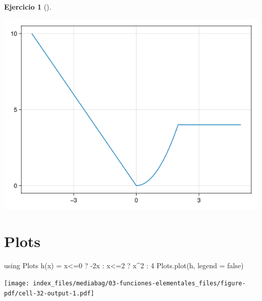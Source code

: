 \documentclass[
  a4paper,
]{scrreport}
\newenvironment{Shaded}{\begin{snugshade}}{\end{snugshade}}
\newcommand{\BuiltInTok}[1]{\textcolor[rgb]{0.00,0.23,0.31}{#1}}
\newcommand{\ConstantTok}[1]{\textcolor[rgb]{0.56,0.35,0.01}{#1}}
\newcommand{\FloatTok}[1]{\textcolor[rgb]{0.68,0.00,0.00}{#1}}
\newcommand{\FunctionTok}[1]{\textcolor[rgb]{0.28,0.35,0.67}{#1}}
\newcommand{\ImportTok}[1]{\textcolor[rgb]{0.00,0.46,0.62}{#1}}
\newcommand{\NormalTok}[1]{\textcolor[rgb]{0.00,0.23,0.31}{#1}}
\newcommand{\OperatorTok}[1]{\textcolor[rgb]{0.37,0.37,0.37}{#1}}
\theoremstyle{definition}
\newtheorem{exercise}{Ejercicio}[chapter]
\theoremstyle{remark}
\begin{document}
\begin{exercise}[]
\begin{tcolorbox}
\includegraphics{03-funciones-elementales_files/figure-pdf/cell-31-output-1.png}

\section{Plots}

\begin{Shaded}
\begin{Highlighting}[]
\ImportTok{using} \BuiltInTok{Plots}
\FunctionTok{h}\NormalTok{(x) }\OperatorTok{=}\NormalTok{ x}\OperatorTok{\textless{}=}\FloatTok{0}\NormalTok{ ? }\OperatorTok{{-}}\FloatTok{2}\NormalTok{x }\OperatorTok{:}\NormalTok{ x}\OperatorTok{\textless{}=}\FloatTok{2}\NormalTok{ ? x}\OperatorTok{\^{}}\FloatTok{2} \OperatorTok{:} \FloatTok{4}
\NormalTok{Plots.}\FunctionTok{plot}\NormalTok{(h, legend }\OperatorTok{=} \ConstantTok{false}\NormalTok{)}
\end{Highlighting}
\end{Shaded}

\texttt{[image: index\_files/mediabag/03-funciones-elementales\_files/figure-pdf/cell-32-output-1.pdf]}

\end{tcolorbox}

\end{exercise}
\end{document}
